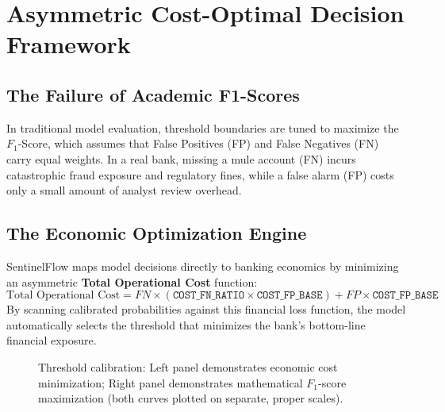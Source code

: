 \documentclass[11pt,a4paper]{article}
\begin{document}
\section{Asymmetric Cost-Optimal Decision Framework}
\subsection*{The Failure of Academic F1-Scores}
In traditional model evaluation, threshold boundaries are tuned to maximize the $F_1$-Score, which assumes that False Positives (FP) and False Negatives (FN) carry equal weights. In a real bank, missing a mule account (FN) incurs catastrophic fraud exposure and regulatory fines, while a false alarm (FP) costs only a small amount of analyst review overhead.

\subsection*{The Economic Optimization Engine}
SentinelFlow maps model decisions directly to banking economics by minimizing an asymmetric \textbf{Total Operational Cost} function:
\[\text{Total Operational Cost} = FN \times (\texttt{COST\_FN\_RATIO} \times \texttt{COST\_FP\_BASE}) + FP \times \texttt{COST\_FP\_BASE}\]
By scanning calibrated probabilities against this financial loss function, the model automatically selects the threshold that minimizes the bank's bottom-line financial exposure.

\begin{figure}[H]
\centering
\begin{minipage}{0.48\textwidth}
\centering
{}
\end{minipage}\hfill
\begin{minipage}{0.48\textwidth}
\centering
{}
\end{minipage}
\caption{Threshold calibration: Left panel demonstrates economic cost minimization; Right panel demonstrates mathematical $F_1$-score maximization (both curves plotted on separate, proper scales).}
\end{figure}
\end{document}
